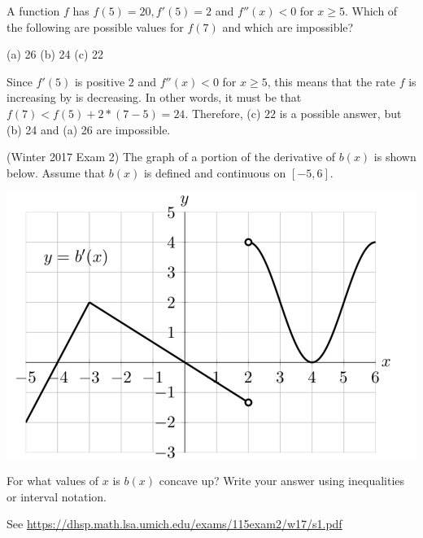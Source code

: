 \documentclass[11pt]{exam}
\begin{document}
\begin{questions}
\begin{solution}
\begin{enumerate}[(a)]
    \end{enumerate}
  \end{solution}
\question A function \(f\) has \(f(5) = 20, f'(5)=2\) and \(f''(x) <
  0\) for \(x \geq 5\). Which of the following are possible values for
  \(f(7)\) and which are impossible?
  \begin{center}
    (a) 26 \hspace{1.5in} (b) 24 \hspace{1.5in} (c) 22
  \end{center}
  \begin{solution}
    Since \(f'(5)\) is positive \(2\) and \(f''(x) < 0\) for \(x \geq
    5\), this means that the rate \(f\) is increasing by is
    decreasing. In other words, it must be that \(f(7) <
    f(5)+2*(7-5) = 24\). Therefore, (c) \(22\) is a possible answer,
    but (b) 24 and (a) 26 are impossible.
  \end{solution}
\question (Winter 2017 Exam 2) The graph of a portion of the derivative of $b(x)$ is shown below. Assume that $b(x)$ is defined and continuous on $[-5,6]$.
  \begin{center}
\includegraphics[scale=0.7]{Figures/graphb.png}
  \end{center}
For what values of $x$ is $b(x)$ concave up? Write your answer using inequalities or interval notation.
  \begin{solution}
    See \href{https://dhsp.math.lsa.umich.edu/exams/115exam2/w17/s1.pdf}{https://dhsp.math.lsa.umich.edu/exams/115exam2/w17/s1.pdf}
  \end{solution}


\end{questions}
\end{document}
